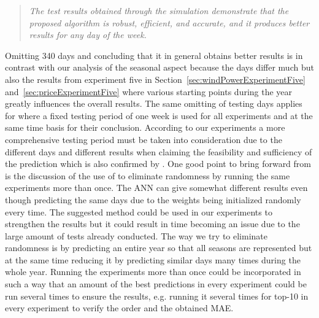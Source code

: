 \begin{quotation}
\textit{The test results obtained through the simulation demonstrate that the proposed algorithm is robust, efficient, and accurate, and it produces better results for any day of the week.}
\end{quotation}

Omitting 340 days and concluding that it in general obtains better results is in contrast with our analysis of the seasonal aspect because the days differ much but also the results from experiment five in Section~\ref{sec:windPowerExperimentFive} and~\ref{sec:priceExperimentFive} where various starting points during the year greatly influences the overall results. The same omitting of testing days applies for \cite{yamin2004adaptive} where a fixed testing period of one week is used for all experiments and at the same time basis for their conclusion. According to our experiments a more comprehensive testing period must be taken into consideration due to the different days and different results when claiming the feasibility and sufficiency of the prediction which is also confirmed by \cite{forecastingSpotPricesAccountingForWindPower}. One good point to bring forward from \cite{yamin2004adaptive} is the discussion of the use of  to eliminate randomness by running the same experiments more than once. The ANN can give somewhat different results even though predicting the same days due to the weights being initialized randomly every time. The suggested method could be used in our experiments to strengthen the results but it could result in time becoming an issue due to the large amount of tests already conducted. The way we try to eliminate randomness is by predicting an entire year so that all seasons are represented but at the same time reducing it by predicting similar days many times during the whole year. Running the experiments more than once could be incorporated in such a way that an amount of the best predictions in every experiment could be run several times to ensure the results, e.g. running it several times for top-10 in every experiment to verify the order and the obtained MAE. 